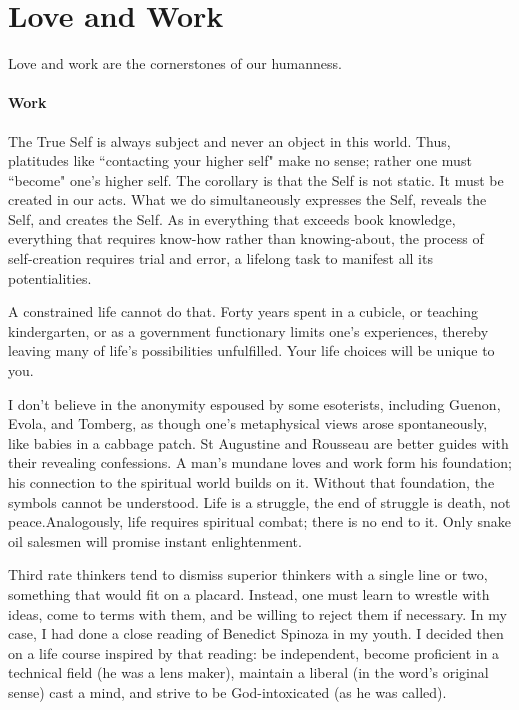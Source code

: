 \section{Love and Work}

\begin{quotex}
Love and work are the cornerstones of our humanness. 

\end{quotex}
\paragraph{Work}
The True Self is always subject and never an object in this world. Thus, platitudes like ``contacting your higher self" make no sense; rather one must ``become" one's higher self. The corollary is that the Self is not static. It must be created in our acts. What we do simultaneously expresses the Self, reveals the Self, and creates the Self. As in everything that exceeds book knowledge, everything that requires know-how rather than knowing-about, the process of self-creation requires trial and error, a lifelong task to manifest all its potentialities.

A constrained life cannot do that. Forty years spent in a cubicle, or teaching kindergarten, or as a government functionary limits one's experiences, thereby leaving many of life's possibilities unfulfilled. Your life choices will be unique to you.

I don't believe in the anonymity espoused by some esoterists, including Guenon, Evola, and Tomberg, as though one's metaphysical views arose spontaneously, like babies in a cabbage patch. St Augustine and Rousseau are better guides with their revealing confessions. A man's mundane loves and work form his foundation; his connection to the spiritual world builds on it. Without that foundation, the symbols cannot be understood. Life is a struggle, the end of struggle is death, not peace.Analogously, life requires spiritual combat; there is no end to it. Only snake oil salesmen will promise instant enlightenment.

Third rate thinkers tend to dismiss superior thinkers with a single line or two, something that would fit on a placard. Instead, one must learn to wrestle with ideas, come to terms with them, and be willing to reject them if necessary. In my case, I had done a close reading of Benedict Spinoza in my youth. I decided then on a life course inspired by that reading: be independent, become proficient in a technical field (he was a lens maker), maintain a liberal (in the word's original sense) cast a mind, and strive to be God-intoxicated (as he was called).

